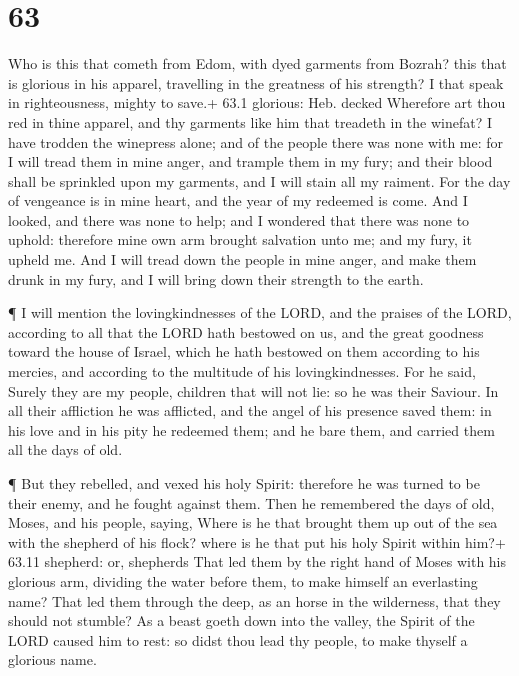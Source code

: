\hypertarget{section-62}{%
\section{63}\label{section-62}}

 Who is this that cometh from Edom, with dyed garments from
Bozrah? this that is glorious in his apparel, travelling in the
greatness of his strength? I that speak in righteousness, mighty to
save.+ 63.1 glorious: Heb. decked  Wherefore art thou red in
thine apparel, and thy garments like him that treadeth in the winefat?
 I have trodden the winepress alone; and of the people there
was none with me: for I will tread them in mine anger, and trample them
in my fury; and their blood shall be sprinkled upon my garments, and I
will stain all my raiment.  For the day of vengeance is in
mine heart, and the year of my redeemed is come.  And I
looked, and there was none to help; and I wondered that there was none
to uphold: therefore mine own arm brought salvation unto me; and my
fury, it upheld me.  And I will tread down the people in
mine anger, and make them drunk in my fury, and I will bring down their
strength to the earth.

 ¶ I will mention the lovingkindnesses of the LORD, and the
praises of the LORD, according to all that the LORD hath bestowed on us,
and the great goodness toward the house of Israel, which he hath
bestowed on them according to his mercies, and according to the
multitude of his lovingkindnesses.  For he said, Surely they
are my people, children that will not lie: so he was their Saviour.
 In all their affliction he was afflicted, and the angel of
his presence saved them: in his love and in his pity he redeemed them;
and he bare them, and carried them all the days of old.

 ¶ But they rebelled, and vexed his holy Spirit: therefore
he was turned to be their enemy, and he fought against them.
 Then he remembered the days of old, Moses, and his people,
saying, Where is he that brought them up out of the sea with the
shepherd of his flock? where is he that put his holy Spirit within him?+
63.11 shepherd: or, shepherds  That led them by the right
hand of Moses with his glorious arm, dividing the water before them, to
make himself an everlasting name?  That led them through
the deep, as an horse in the wilderness, that they should not stumble?
 As a beast goeth down into the valley, the Spirit of the
LORD caused him to rest: so didst thou lead thy people, to make thyself
a glorious name.

